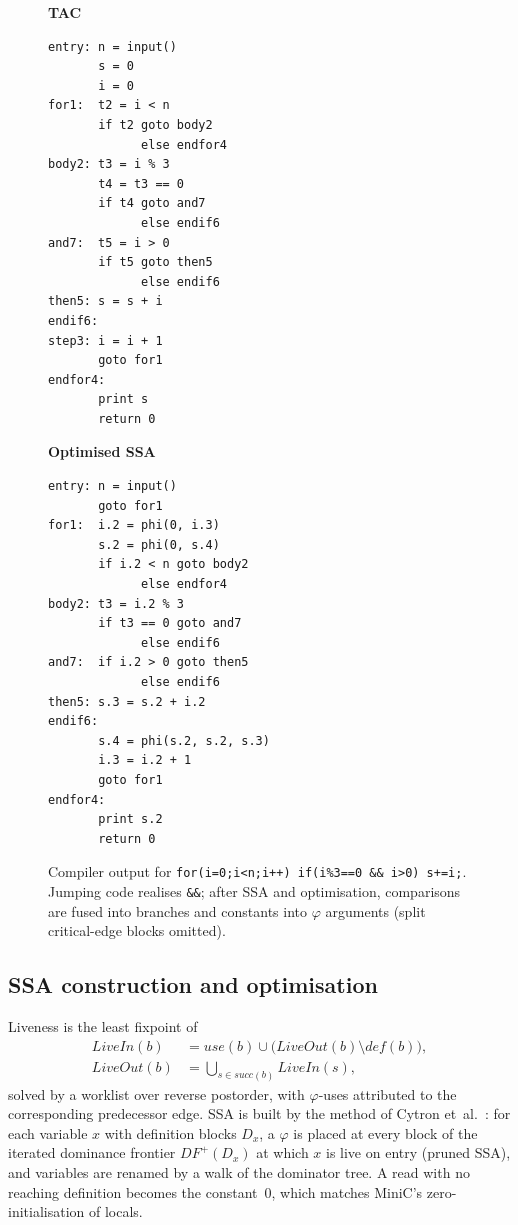 \documentclass{ieeeaccess}
\newcommand{\tm}[1]{\texttt{#1}}
\begin{document}
\begin{figure}[t]
\centering
\begin{minipage}[t]{0.47\columnwidth}
\scriptsize\textbf{TAC}\vspace{-1mm}
\begin{verbatim}
entry: n = input()
       s = 0
       i = 0
for1:  t2 = i < n
       if t2 goto body2
             else endfor4
body2: t3 = i % 3
       t4 = t3 == 0
       if t4 goto and7
             else endif6
and7:  t5 = i > 0
       if t5 goto then5
             else endif6
then5: s = s + i
endif6:
step3: i = i + 1
       goto for1
endfor4:
       print s
       return 0
\end{verbatim}
\end{minipage}\hfill
\begin{minipage}[t]{0.5\columnwidth}
\scriptsize\textbf{Optimised SSA}\vspace{-1mm}
\begin{verbatim}
entry: n = input()
       goto for1
for1:  i.2 = phi(0, i.3)
       s.2 = phi(0, s.4)
       if i.2 < n goto body2
             else endfor4
body2: t3 = i.2 % 3
       if t3 == 0 goto and7
             else endif6
and7:  if i.2 > 0 goto then5
             else endif6
then5: s.3 = s.2 + i.2
endif6:
       s.4 = phi(s.2, s.2, s.3)
       i.3 = i.2 + 1
       goto for1
endfor4:
       print s.2
       return 0
\end{verbatim}
\end{minipage}
\caption{Compiler output for
\tm{for(i=0;i<n;i++) if(i\%3==0 \&\& i>0) s+=i;}. Jumping code realises
\tm{\&\&}; after SSA and optimisation, comparisons are fused into
branches and constants into $\varphi$ arguments (split critical-edge
blocks omitted).}
\label{fig:tac}
\end{figure}

\subsection{SSA construction and optimisation}

Liveness is the least fixpoint of
\begin{equation}
\begin{aligned}
\mathit{LiveIn}(b)&=\mathit{use}(b)\cup\big(\mathit{LiveOut}(b)\setminus\mathit{def}(b)\big),\\
\mathit{LiveOut}(b)&=\textstyle\bigcup_{s\in\mathit{succ}(b)}\mathit{LiveIn}(s),
\end{aligned}
\label{eq:liveness}
\end{equation}
solved by a worklist over reverse postorder, with $\varphi$-uses
attributed to the corresponding predecessor edge. SSA is built by the
method of Cytron et~al.~\cite{cytron1991ssa}: for each variable $x$ with
definition blocks $D_x$, a $\varphi$ is placed at every block of the
iterated dominance frontier $\mathit{DF}^{+}(D_x)$ at which $x$ is live
on entry (pruned SSA), and variables are renamed by a walk of the
dominator tree. A read with no reaching definition becomes the
constant~0, which matches MiniC's zero-initialisation of locals.
\end{document}
